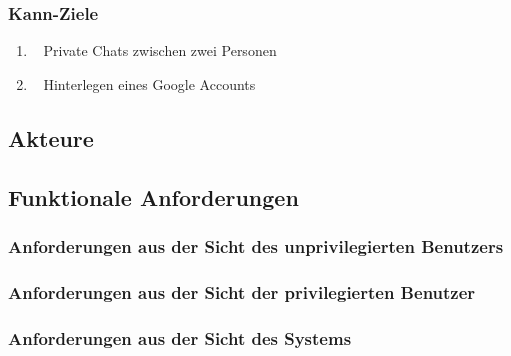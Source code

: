 \documentclass[12pt]{article}
\begin{document}
      \subsubsection{Kann-Ziele}
        \begin{enumerate}
          \item \faUsers~ Private Chats zwischen zwei Personen
          \item \faGoogle~ Hinterlegen eines Google Accounts
        \end{enumerate}

    \subsection{Akteure}

    \subsection{Funktionale Anforderungen}
      \subsubsection{Anforderungen aus der Sicht des unprivilegierten Benutzers}
      \subsubsection{Anforderungen aus der Sicht der privilegierten Benutzer}
      \subsubsection{Anforderungen aus der Sicht des Systems}
\end{document}
